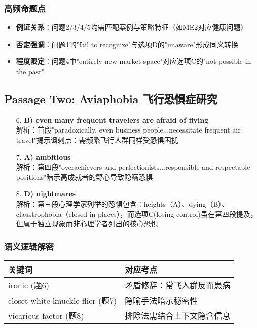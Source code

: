\documentclass{article}
\begin{document}
\subsubsection*{高频命题点}
\begin{itemize}
    \item \textbf{例证关系}：问题2/3/4/5均需匹配案例与策略特征（如ME2对应健康问题）
    \item \textbf{否定强调}：问题1的"fail to recognize"与选项D的"unaware"形成同义转换
    \item \textbf{程度限定}：问题4中"entirely new market space"对应选项C的"not possible in the past"
\end{itemize}

\subsection*{Passage Two: Aviaphobia 飞行恐惧症研究}
\begin{enumerate}
    \item[6.] \textbf{B) even many frequent travelers are afraid of flying} \\ 
    解析：首段"paradoxically, even business people...necessitate frequent air travel"揭示讽刺点：需频繁飞行人群同样受恐惧困扰
    
    \item[7.] \textbf{A) ambitious} \\ 
    解析：第四段"overachievers and perfectionists...responsible and respectable positions"暗示高成就者的野心导致隐瞒恐惧
    
    \item[8.] \textbf{D) nightmares} \\ 
    解析：第三段心理学家列举的恐惧包含：heights（A）、dying（B）、claustrophobia（closed-in places），而选项C(losing control)虽在第四段提及，但属于独立现象而非心理学者列出的核心恐惧
\end{enumerate}

\subsubsection*{语义逻辑解密}
\begin{tabular}{|l|l|}
\hline
\textbf{关键词} & \textbf{对应考点} \\
\hline
ironic (题6) & 矛盾修辞：常飞人群反而患病 \\
closet white-knuckle flier (题7) & 隐喻手法暗示秘密性 \\
vicarious factor (题8) & 排除法需结合上下文隐含信息 \\
\hline
\end{tabular}
\end{document}
